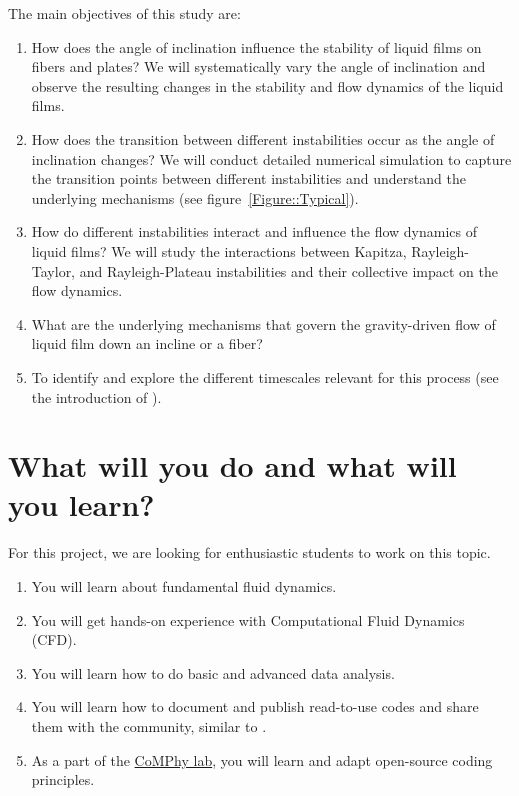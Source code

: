 \documentclass[11pt]{article}
\begin{document}
\noindent The main objectives of this study are:

\begin{enumerate}
	\item How does the angle of inclination influence the stability of liquid films on fibers and plates? We will systematically vary the angle of inclination and observe the resulting changes in the stability and flow dynamics of the liquid films.
	
	\item How does the transition between different instabilities occur as the angle of inclination changes? We will conduct detailed numerical simulation to capture the transition points between different instabilities and understand the underlying mechanisms (see figure~\ref{Figure::Typical}). 
	
	\item How do different instabilities interact and influence the flow dynamics of liquid films? We will study the interactions between Kapitza, Rayleigh-Taylor, and Rayleigh-Plateau instabilities and their collective impact on the flow dynamics.
	
	\item What are the underlying mechanisms that govern the gravity-driven flow of liquid film down an incline or a fiber?
		
	\item To identify and explore the different timescales relevant for this process (see the introduction of \citet{VatsalThesis}).
\end{enumerate}

\section*{What will you do and what will you learn?}
For this project, we are looking for enthusiastic students to work on this topic.
\begin{enumerate}
\itemsep0em
\item You will learn about fundamental fluid dynamics.
\item You will get hands-on experience with Computational Fluid Dynamics (CFD).
\item You will learn how to do basic and advanced data analysis.
\item You will learn how to document and publish read-to-use codes and share them with the community, similar to \citet{basiliskVatsal, basiliskVatsalDropFilm, basiliskVatsalViscousBouncing}. 
\item As a part of the \href{https://comphy-lab.org}{CoMPhy lab}, you will learn and adapt open-source coding principles. 

\end{enumerate}
\end{document}
